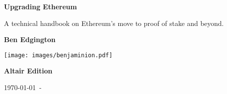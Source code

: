 \begin{titlepage}

   \begin{center}

     \vspace*{1.0cm}

     \Huge

     \textbf{Upgrading Ethereum}

     \vfill

     \Large

     A technical handbook on Ethereum's move to proof of stake and beyond.

     \vfill

     \textbf{Ben Edgington}

     \vfill

     \texttt{[image: images/benjaminion.pdf]}

     \vfill

     \textbf{Altair Edition}

     \vfill

     \normalsize

     \today\ - \href{https://github.com/benjaminion/upgrading-ethereum-book}{\texttt{}}

   \end{center}
   \restoregeometry
\end{titlepage}
